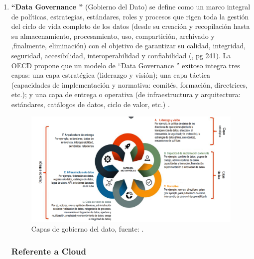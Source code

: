 \begin{enumerate}
	\item \textbf{``Data Governance ''} \label{def10} (Gobierno del Dato) se define como un marco integral de políticas, estrategias, estándares, roles y procesos que rigen toda la gestión del ciclo de vida completo de los datos (desde su creación y recopilación hasta su almacenamiento, procesamiento, uso, compartición, archivado y ,finalmente, eliminación) con el objetivo de garantizar su calidad, integridad, seguridad, accesibilidad, interoperabilidad y confiabilidad (\cite{HerreraCapriz2024}, pg 241). La OECD propone que un modelo de ``Data Governance '' exitoso integra tres capas: una capa estratégica (liderazgo y visión); una capa táctica (capacidades de implementación y normativa: comités, formación, directrices, etc.); y una capa de entrega o operativa (de infraestructura y arquitectura: estándares, catálogos de datos, ciclo de valor, etc.) \citep{OECD2019}.
			
	\begin{figure}[!tbp]
		\begin{center}
			\includegraphics[scale=0.3]{Imagenes/Bitmap/data_gobernance.png} 
			\caption{Capas de gobierno del dato, fuente: \citep{OECD2019}.}
		\end{center}
	\end{figure}
	
	
	\newpage
	
	
	\subsubsection{Referente a Cloud}
	

\end{enumerate}
